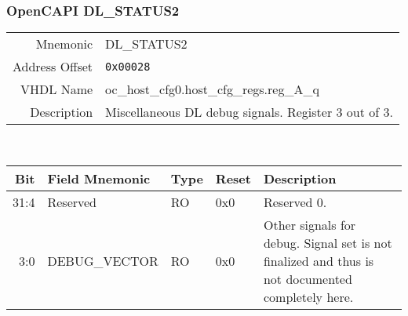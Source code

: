\subsubsection{OpenCAPI DL\_STATUS2}
\begin{tabular}{ r | p{350px} }
  Mnemonic       & DL\_STATUS2                              \\
  Address Offset & \texttt{0x00028}                         \\
  VHDL Name      & oc\_host\_cfg0.host\_cfg\_regs.reg\_A\_q \\ \hline

  Description &
  Miscellaneous DL debug signals. Register 3 out of 3. \\

\end{tabular}
\\
\begin{tabularx}{\textwidth}{r|l|l|l|X}
  \hline
  Bit  & Field Mnemonic & Type & Reset & Description \\ \hline

  31:4 & Reserved       & RO   & 0x0   & Reserved 0. \\
  3:0  & DEBUG\_VECTOR  & RO   & 0x0   & Other signals for debug. Signal set is not finalized and thus is not documented completely here. \\
\end{tabularx}
